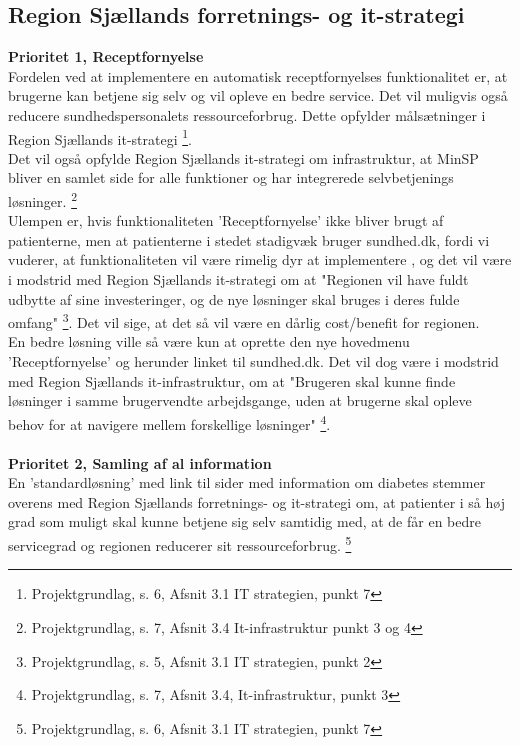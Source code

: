 \subsection{Region Sjællands forretnings- og it-strategi}
\textbf{Prioritet 1, Receptfornyelse}\\
Fordelen ved at implementere en automatisk receptfornyelses funktionalitet er, at brugerne kan betjene sig selv og vil opleve en bedre service. Det vil muligvis også reducere sundhedspersonalets ressourceforbrug. Dette opfylder målsætninger i Region Sjællands it-strategi \footnote{Projektgrundlag, s. 6, Afsnit 3.1 IT strategien, punkt 7 }.\\
Det vil også opfylde Region Sjællands it-strategi om infrastruktur, at MinSP bliver en samlet side for alle funktioner og har integrerede selvbetjenings løsninger. \footnote{Projektgrundlag, s. 7, Afsnit 3.4 It-infrastruktur punkt 3 og 4}\\
Ulempen er, hvis funktionaliteten 'Receptfornyelse' ikke bliver brugt af patienterne, men at patienterne i stedet stadigvæk bruger sundhed.dk, fordi vi vuderer, at funktionaliteten vil være rimelig dyr at implementere
, og det vil være i modstrid med Region Sjællands it-strategi om at "Regionen vil have fuldt udbytte af sine investeringer, og de nye løsninger skal bruges i deres fulde omfang" \footnote{Projektgrundlag, s. 5, Afsnit 3.1 IT strategien, punkt 2}. Det vil sige, at det så vil være en dårlig cost/benefit for regionen.\\ 
En bedre løsning ville så være kun at oprette den nye hovedmenu 'Receptfornyelse' og herunder linket til sundhed.dk. Det vil dog være i modstrid med Region Sjællands it-infrastruktur, om at "Brugeren skal kunne finde løsninger i samme brugervendte arbejdsgange, uden at brugerne skal opleve behov for at navigere mellem forskellige løsninger" \footnote{Projektgrundlag, s. 7, Afsnit 3.4, It-infrastruktur, punkt 3}. 
\\\\
\textbf{Prioritet 2, Samling af al information}\\
En 'standardløsning' med link til sider med information om diabetes stemmer overens med Region Sjællands forretnings- og it-strategi om, at patienter i så høj grad som muligt skal kunne betjene sig selv samtidig med, at de får en bedre servicegrad og regionen reducerer sit ressourceforbrug. \footnote{Projektgrundlag, s. 6, Afsnit 3.1 IT strategien, punkt 7} \\
